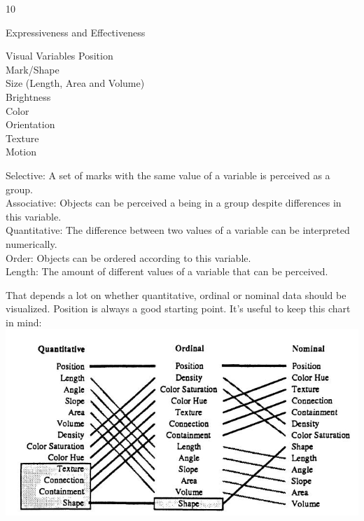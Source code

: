 \documentclass{article}
\begin{document}
\begin{ukon-infie}[24.01.18]{10}
\begin{exercise}[p=5]{Expressiveness and Effectiveness}
		\end{exercise}		
		
		\begin{exercise}[p=5]{Visual Variables}
			\question{}
			{
				Position\\
				Mark/Shape\\
				Size (Length, Area and Volume)\\
				Brightness\\
				Color\\
				Orientation\\
				Texture\\
				Motion\\
			}
			
			\question{}
			{
				Selective: A set of marks with the same value of a variable is perceived as a group.\\
				Associative: Objects can be perceived a being in a group despite differences in this variable.\\
				Quantitative: The difference between two values of a variable can be interpreted numerically.\\
				Order: Objects can be ordered according to this variable.\\
				Length: The amount of different values of a variable that can be perceived.
			}
			
			\question{}
			{
				That depends a lot on whether quantitative, ordinal or nominal data should be visualized. Position is always a good starting point. It's useful to keep this chart in mind:\\
				\includegraphics[scale=0.6]{order.jpg}
			}
		\end{exercise}
		
\end{ukon-infie}
\end{document}
